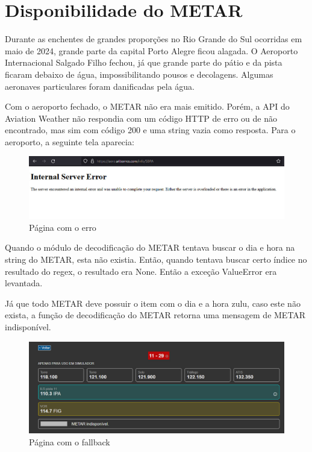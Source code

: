 \chapter{Disponibilidade do METAR}

Durante as enchentes de grandes proporções no Rio Grande do Sul ocorridas em maio de 2024, grande
parte da capital Porto Alegre ficou alagada. O Aeroporto Internacional Salgado Filho fechou, já
que grande parte do pátio e da pista ficaram debaixo de água, impossibilitando pousos e decolagens.
Algumas aeronaves particulares foram danificadas pela água.

Com o aeroporto fechado, o METAR não era mais emitido. Porém, a API do Aviation Weather não
respondia com um código HTTP de erro ou de não encontrado, mas sim com código 200 e uma string
vazia como resposta. Para o aeroporto, a seguinte tela aparecia:

\begin{figure}[ht]
    \begin{center}
    \includegraphics[width=400pt]{img/sbpa-erro.jpeg}
    \caption{Página com o erro}
    \label{fig:sbpa-erro}
    \end{center}
\end{figure}

Quando o módulo de decodificação do METAR tentava buscar o dia e hora na string do METAR, esta
não existia. Então, quando tentava buscar certo índice no resultado do regex, o resultado era None.
Então a exceção ValueError era levantada.

Já que todo METAR deve possuir o item com o dia e a hora zulu, caso este não exista, a função de
decodificação do METAR retorna uma mensagem de METAR indisponível.

\begin{figure}[ht]
    \begin{center}
    \includegraphics[width=400pt]{img/sbpa.jpeg}
    \caption{Página com o fallback}
    \label{fig:sbpa}
    \end{center}
\end{figure}
